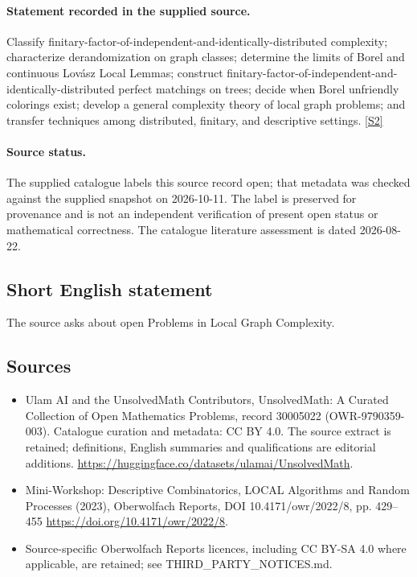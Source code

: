 \documentclass[11pt]{article}
\begin{document}
\paragraph{Statement recorded in the supplied source.}
Classify finitary-factor-of-independent-and-identically-distributed complexity; characterize derandomization on graph classes; determine the limits of Borel and continuous Lovász Local Lemmas; construct finitary-factor-of-independent-and-identically-distributed perfect matchings on trees; decide when Borel unfriendly colorings exist; develop a general complexity theory of local graph problems; and transfer techniques among distributed, finitary, and descriptive settings. \href{https://doi.org/10.4171/owr/2022/8}{[S2]}
\paragraph{Source status.}
The supplied catalogue labels this source record open; that metadata was checked against the supplied snapshot on 2026-10-11. The label is preserved for provenance and is not an independent verification of present open status or mathematical correctness. The catalogue literature assessment is dated 2026-08-22.
\subsection{Short English statement}
The source asks about open Problems in Local Graph Complexity.
\subsection{Sources}
\begin{itemize}
\item[S1] Ulam AI and the UnsolvedMath Contributors, UnsolvedMath: A Curated Collection of Open Mathematics Problems, record 30005022 (OWR-9790359-003). Catalogue curation and metadata: CC BY 4.0. The source extract is retained; definitions, English summaries and qualifications are editorial additions.
\url{https://huggingface.co/datasets/ulamai/UnsolvedMath}.
\item[S2] Mini-Workshop: Descriptive Combinatorics, LOCAL Algorithms and Random Processes (2023), Oberwolfach Reports, DOI 10.4171/owr/2022/8, pp. 429--455
\url{https://doi.org/10.4171/owr/2022/8}.
\item Source-specific Oberwolfach Reports licences, including CC BY-SA 4.0 where applicable, are retained; see THIRD\_PARTY\_NOTICES.md.
\end{itemize}
\end{document}
